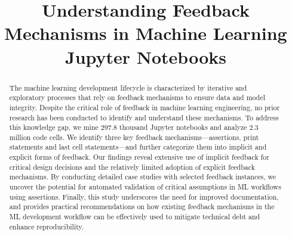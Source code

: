 \documentclass[journal]{IEEEtran}       %
\begin{document}
\title{Understanding Feedback Mechanisms in Machine Learning Jupyter Notebooks}


\author{
  \and
  \and
  \and
}

\maketitle

\begin{abstract}
  The machine learning development lifecycle is characterized by
  iterative and exploratory processes that rely on feedback
  mechanisms to ensure data and model integrity. Despite the critical
  role of feedback in machine learning engineering, no prior research
  has been conducted to identify and understand these mechanisms. To
  address this knowledge gap, we mine 297.8 thousand Jupyter
  notebooks and analyze 2.3 million code cells. We identify three key
  feedback mechanisms---assertions, print statements and last cell
  statements---and further categorize them into implicit and explicit
  forms of feedback. Our findings reveal extensive use of implicit
  feedback for critical design decisions and the relatively limited
  adoption of explicit feedback mechanisms. By conducting detailed
  case studies with selected feedback instances, we uncover the
  potential for automated validation of critical assumptions in ML
  workflows using assertions. Finally, this study underscores the
  need for improved documentation, and provides practical
  recommendations on how existing feedback mechanisms in the ML
  development workflow can be effectively used to mitigate technical
  debt and enhance reproducibility.
\end{abstract}
\end{document}
